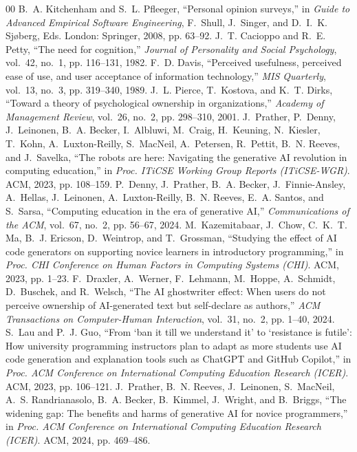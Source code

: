 \documentclass[conference]{IEEEtran}
\begin{document}
\begin{thebibliography}{00}
 B.~A. Kitchenham and S.~L. Pfleeger, ``Personal opinion surveys,'' in \emph{Guide to Advanced Empirical Software Engineering}, F.~Shull, J.~Singer, and D.~I.~K. Sj{\o}berg, Eds. London: Springer, 2008, pp. 63--92.
 J.~T. Cacioppo and R.~E. Petty, ``The need for cognition,'' \emph{Journal of Personality and Social Psychology}, vol.~42, no.~1, pp. 116--131, 1982.
 F.~D. Davis, ``Perceived usefulness, perceived ease of use, and user acceptance of information technology,'' \emph{MIS Quarterly}, vol.~13, no.~3, pp. 319--340, 1989.
 J.~L. Pierce, T.~Kostova, and K.~T. Dirks, ``Toward a theory of psychological ownership in organizations,'' \emph{Academy of Management Review}, vol.~26, no.~2, pp. 298--310, 2001.
 J.~Prather, P.~Denny, J.~Leinonen, B.~A. Becker, I.~Albluwi, M.~Craig, H.~Keuning, N.~Kiesler, T.~Kohn, A.~Luxton-Reilly, S.~MacNeil, A.~Petersen, R.~Pettit, B.~N. Reeves, and J.~Savelka, ``The robots are here: Navigating the generative AI revolution in computing education,'' in \emph{Proc. ITiCSE Working Group Reports (ITiCSE-WGR)}. ACM, 2023, pp. 108--159.
 P.~Denny, J.~Prather, B.~A. Becker, J.~Finnie-Ansley, A.~Hellas, J.~Leinonen, A.~Luxton-Reilly, B.~N. Reeves, E.~A. Santos, and S.~Sarsa, ``Computing education in the era of generative AI,'' \emph{Communications of the ACM}, vol.~67, no.~2, pp. 56--67, 2024.
 M.~Kazemitabaar, J.~Chow, C.~K.~T. Ma, B.~J. Ericson, D.~Weintrop, and T.~Grossman, ``Studying the effect of AI code generators on supporting novice learners in introductory programming,'' in \emph{Proc. CHI Conference on Human Factors in Computing Systems (CHI)}. ACM, 2023, pp. 1--23.
 F.~Draxler, A.~Werner, F.~Lehmann, M.~Hoppe, A.~Schmidt, D.~Buschek, and R.~Welsch, ``The AI ghostwriter effect: When users do not perceive ownership of AI-generated text but self-declare as authors,'' \emph{ACM Transactions on Computer-Human Interaction}, vol.~31, no.~2, pp. 1--40, 2024.
 S.~Lau and P.~J. Guo, ``From `ban it till we understand it' to `resistance is futile': How university programming instructors plan to adapt as more students use AI code generation and explanation tools such as ChatGPT and GitHub Copilot,'' in \emph{Proc. ACM Conference on International Computing Education Research (ICER)}. ACM, 2023, pp. 106--121.
 J.~Prather, B.~N. Reeves, J.~Leinonen, S.~MacNeil, A.~S. Randrianasolo, B.~A. Becker, B.~Kimmel, J.~Wright, and B.~Briggs, ``The widening gap: The benefits and harms of generative AI for novice programmers,'' in \emph{Proc. ACM Conference on International Computing Education Research (ICER)}. ACM, 2024, pp. 469--486.

\end{thebibliography}
\end{document}
